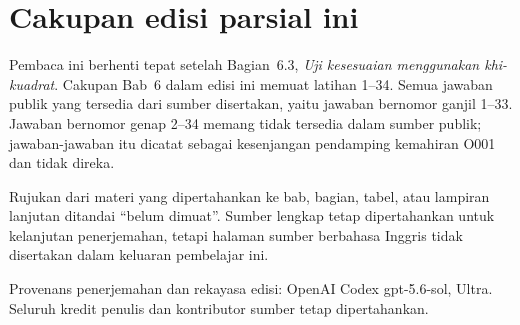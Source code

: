 \documentclass[10pt,openany]%
{book}
\date{}
\begin{document}
%
\renewcommand{\thepage}{}
\maketitle

\renewcommand{\thepage}{\arabic{page}}
\tableofcontents

\normalsize

\chapter*{Cakupan edisi parsial ini}
Pembaca ini berhenti tepat setelah Bagian~6.3,
\emph{Uji kesesuaian menggunakan khi-kuadrat}. Cakupan Bab~6 dalam edisi
ini memuat latihan 1--34. Semua jawaban publik yang tersedia dari sumber
disertakan, yaitu jawaban bernomor ganjil 1--33. Jawaban bernomor genap
2--34 memang tidak tersedia dalam sumber publik; jawaban-jawaban itu
dicatat sebagai kesenjangan pendamping kemahiran O001 dan tidak direka.

Rujukan dari materi yang dipertahankan ke bab, bagian, tabel, atau lampiran
lanjutan ditandai ``belum dimuat''. Sumber lengkap tetap dipertahankan untuk
kelanjutan penerjemahan, tetapi halaman sumber berbahasa Inggris tidak
disertakan dalam keluaran pembelajar ini.

Provenans penerjemahan dan rekayasa edisi: OpenAI Codex gpt-5.6-sol, Ultra.
Seluruh kredit penulis dan kontributor sumber tetap dipertahankan.

\begingroup
\makeatletter
\def\@currentlabel{belum dimuat}
\label{ch_regr_mult_and_log}
\label{ch_inference_for_means}
\label{oneSampleMeansWithTDistribution}
\label{ch_regr_simple_linear}
\label{appendix_data}
\label{linRegrForTwoVar}
\label{normalProbabilityTable}
\label{chiSquareProbabilityTable}
\label{multipleAndLogisticRegression}
\makeatother
\endgroup

\begingroup

%
\setcounter{chapter}{1}
\addtocounter{chapter}{-1}
\normalsize


\setcounter{chapter}{2}
\addtocounter{chapter}{-1}
\normalsize


\setcounter{chapter}{3}
\addtocounter{chapter}{-1}
\normalsize

\setcounter{chapter}{4}
\addtocounter{chapter}{-1}
\normalsize

\setcounter{chapter}{5}
\addtocounter{chapter}{-1}
\normalsize

\setcounter{chapter}{6}
\addtocounter{chapter}{-1}
\normalsize

\endgroup

\begingroup

\appendix{}
\endgroup
\end{document}
